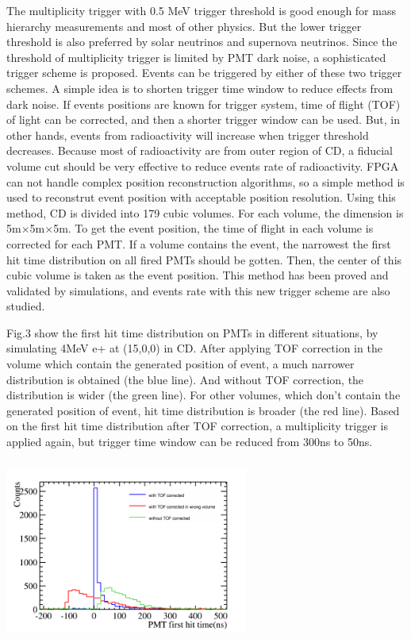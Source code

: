 \documentclass[a4paper,10pt,twoside]{paper}
\begin{document}
\begin{multicols}{2}
		The multiplicity trigger with 0.5 MeV trigger threshold is good enough for mass hierarchy measurements and most of other physics. 
		But the lower trigger threshold is also preferred by solar neutrinos and supernova neutrinos.
		Since the threshold of multiplicity trigger is limited by PMT dark noise, a sophisticated trigger scheme is proposed.
		Events can be triggered by either of these two trigger schemes. A simple idea is to shorten trigger time window to reduce effects from dark noise.
		If events positions are known for trigger system, time of flight (TOF) of light can be corrected, and then a shorter trigger window can be used.
		But, in other hands, events from radioactivity will increase when trigger threshold decreases.
		Because most of radioactivity are from outer region of CD, a fiducial volume cut should be very effective to reduce events rate of radioactivity.
		FPGA can not handle complex position reconstruction algorithms, so a simple method is used to reconstrut event position with acceptable position resolution.
		Using this method, CD is divided into 179 cubic volumes. For each volume, the dimension is 5m$\times$5m$\times$5m.
		To get the event position, the time of flight in each volume is corrected for each PMT. If a volume contains the event, 
		the narrowest the first hit time distribution on all fired PMTs should be gotten. 
		Then, the center of this cubic volume is taken as the event position.
		This method has been proved and validated by simulations, and events rate with this new trigger scheme are also studied.


		Fig.3 show the first hit time distribution on PMTs in different situations,
		by simulating 4MeV e+ at (15,0,0) in CD. After applying TOF correction in the 
		volume which contain the generated position of event, a much narrower distribution 
		is obtained (the blue line). And without TOF correction, the distribution is wider (the green line).
		For other volumes, which don't contain the generated position of event, hit time distribution is broader (the red line).
		Based on the first hit time distribution after TOF correction, a multiplicity trigger is applied again, but trigger time window can be reduced from
		300ns to 50ns. 

		\begin{center}
			\includegraphics[width=8cm,height=6cm]{4MeV_e+_PMT_first_hitTime_all.png}
		\end{center}



\end{multicols}
\end{document}

